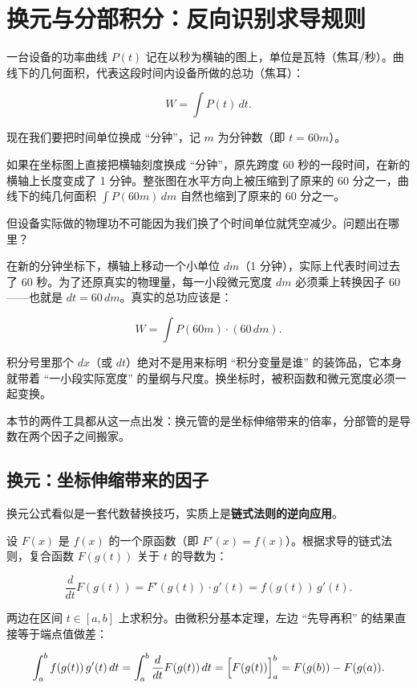 \section{换元与分部积分：反向识别求导规则}
\label{sec:02-Calculus/04-Integration/03}

一台设备的功率曲线 \(P(t)\) 记在以秒为横轴的图上，单位是瓦特（焦耳/秒）。曲线下的几何面积，代表这段时间内设备所做的总功（焦耳）：

\[
W = \int P(t)\,dt.
\]

现在我们要把时间单位换成 ``分钟''，记 \(m\) 为分钟数（即 \(t = 60m\)）。

如果在坐标图上直接把横轴刻度换成 ``分钟''，原先跨度 60 秒的一段时间，在新的横轴上长度变成了 1 分钟。整张图在水平方向上被压缩到了原来的 60 分之一，曲线下的纯几何面积 \(\int P(60m)\,dm\) 自然也缩到了原来的 60 分之一。

但设备实际做的物理功不可能因为我们换了个时间单位就凭空减少。问题出在哪里？

在新的分钟坐标下，横轴上移动一个小单位 \(dm\)（1 分钟），实际上代表时间过去了 60 秒。为了还原真实的物理量，每一小段微元宽度 \(dm\) 必须乘上转换因子 60——也就是 \(dt = 60\,dm\)。真实的总功应该是：

\[
W = \int P(60m) \cdot (60\,dm).
\]

积分号里那个 \(dx\)（或 \(dt\)）绝对不是用来标明 ``积分变量是谁'' 的装饰品，它本身就带着 ``一小段实际宽度'' 的量纲与尺度。换坐标时，被积函数和微元宽度必须一起变换。

本节的两件工具都从这一点出发：换元管的是坐标伸缩带来的倍率，分部管的是导数在两个因子之间搬家。

\subsection{换元：坐标伸缩带来的因子}

换元公式看似是一套代数替换技巧，实质上是\textbf{链式法则的逆向应用}。

设 \(F(x)\) 是 \(f(x)\) 的一个原函数（即 \(F'(x) = f(x)\)）。根据求导的链式法则，复合函数 \(F(g(t))\) 关于 \(t\) 的导数为：


\[
\frac{d}{dt} F(g(t)) = F'(g(t)) \cdot g'(t) = f(g(t)) \, g'(t).
\]

两边在区间 \(t \in [a, b]\) 上求积分。由微积分基本定理，左边 ``先导再积'' 的结果直接等于端点值做差：


\[
\int_a^b f(g(t)) \, g'(t) \, dt = \int_a^b \frac{d}{dt}F(g(t)) \, dt = \Bigl[ F(g(t)) \Bigr]_a^b = F(g(b)) - F(g(a)).
\]

